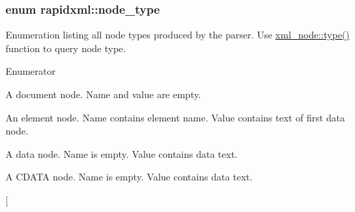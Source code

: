 \subsubsection[{\texorpdfstring{node\+\_\+type}{node_type}}]{\setlength{\rightskip}{0pt plus 5cm}enum {\bf rapidxml\+::node\+\_\+type}}\hypertarget{namespacerapidxml_abb456db38f7efb746c4330eed6072a7c}{}\label{namespacerapidxml_abb456db38f7efb746c4330eed6072a7c}
Enumeration listing all node types produced by the parser. Use \hyperlink{classrapidxml_1_1xml__node_a2c6a4315b98bcfa2e04fed3fa1b22c36}{xml\+\_\+node\+::type()} function to query node type. \begin{Desc}
\item[Enumerator]\par
\begin{description}
\item[{\em 
node\+\_\+document\hypertarget{namespacerapidxml_abb456db38f7efb746c4330eed6072a7ca4023b6a1c7059fd8fbec2112d5c35424}{}\label{namespacerapidxml_abb456db38f7efb746c4330eed6072a7ca4023b6a1c7059fd8fbec2112d5c35424}
}]A document node. Name and value are empty. \item[{\em 
node\+\_\+element\hypertarget{namespacerapidxml_abb456db38f7efb746c4330eed6072a7ca89cbeb4d28046326e4ee953d3c4047ff}{}\label{namespacerapidxml_abb456db38f7efb746c4330eed6072a7ca89cbeb4d28046326e4ee953d3c4047ff}
}]An element node. Name contains element name. Value contains text of first data node. \item[{\em 
node\+\_\+data\hypertarget{namespacerapidxml_abb456db38f7efb746c4330eed6072a7ca9d669d8e1f4ba9c7eeada4c14a11ad1d}{}\label{namespacerapidxml_abb456db38f7efb746c4330eed6072a7ca9d669d8e1f4ba9c7eeada4c14a11ad1d}
}]A data node. Name is empty. Value contains data text. \item[{\em 
node\+\_\+cdata\hypertarget{namespacerapidxml_abb456db38f7efb746c4330eed6072a7caccf0b363d3876a3f83ff9b1bcdaaa536}{}\label{namespacerapidxml_abb456db38f7efb746c4330eed6072a7caccf0b363d3876a3f83ff9b1bcdaaa536}
}]A C\+D\+A\+TA node. Name is empty. Value contains data text. \item[{\em 
}
\end{description}
\end{Desc}

